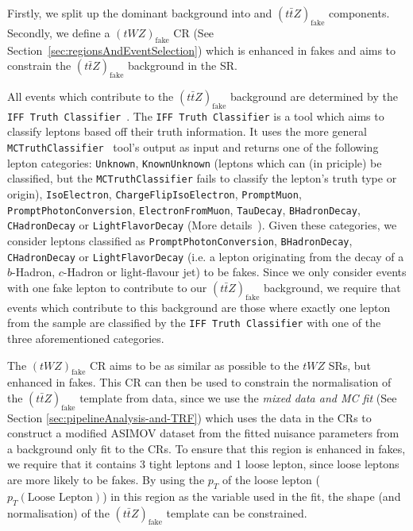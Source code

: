 Firstly, we split up the dominant \ttZ background into \ttZ and $(t\bar{t}Z)_{\text{fake}}$ components. Secondly, we define a $(tWZ)_{\text{fake}}$ CR (See Section~\ref{sec:regionsAndEventSelection}) which is enhanced in fakes and aims to constrain the $(t\bar{t}Z)_{\text{fake}}$ background in the SR.

 All events which contribute to the $(t\bar{t}Z)_{\text{fake}}$ background are determined by the \texttt{IFF Truth Classifier}~\cite{IFFTruthClassifier}. The \texttt{IFF Truth Classifier} is a tool which aims to classify leptons based off their truth information. It uses the more general \texttt{MCTruthClassifier}~\cite{MCTruthClassifier} tool's output as input and returns one of the following lepton categories: \texttt{Unknown}, \texttt{KnownUnknown} (leptons which can (in priciple) be classified, but the \texttt{MCTruthClassifier} fails to classify the lepton's truth type or origin), \texttt{IsoElectron}, \texttt{ChargeFlipIsoElectron}, \texttt{PromptMuon}, \texttt{PromptPhotonConversion}, \texttt{ElectronFromMuon}, \texttt{TauDecay}, \texttt{BHadronDecay}, \texttt{CHadronDecay} or \texttt{LightFlavorDecay} (More details~\cite{IFFTruthClassifier-leptonCategories}). Given these categories, we consider leptons classified as \texttt{PromptPhotonConversion}, \texttt{BHadronDecay}, \texttt{CHadronDecay} or \texttt{LightFlavorDecay} (i.e. a lepton originating from the decay of a $b$-Hadron, $c$-Hadron or light-flavour jet) to be fakes. Since we only consider events with one fake lepton to contribute to our $(t\bar{t}Z)_{\text{fake}}$ background, we require that events which contribute to this background are those where exactly one lepton from the \ttZ sample are classified by the \texttt{IFF Truth Classifier} with one of the three aforementioned categories.

The $(tWZ)_{\text{fake}}$ CR aims to be as similar as possible to the $tWZ$ SRs, but enhanced in fakes. This CR can then be used to constrain the normalisation of the $(t\bar{t}Z)_{\text{fake}}$ template from data, since we use the \textit{mixed data and MC fit} (See Section \ref{sec:pipelineAnalysis-and-TRF}) which uses the data in the CRs to construct a modified ASIMOV dataset from the fitted nuisance parameters from a background only fit to the CRs. To ensure that this region is enhanced in fakes, we require that it contains 3 tight leptons and 1 loose lepton, since loose leptons are more likely to be fakes. By using the $p_{T}$ of the loose lepton ($p_{T}(\text{Loose Lepton})$) in this region as the variable used in the fit, the shape (and normalisation) of the $(t\bar{t}Z)_{\text{fake}}$ template can be constrained.

